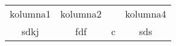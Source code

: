 \documentclass{article}
\begin{document}
\begin{table}[ht]
\centering
\caption{}
\begin{tabular} {cccc}
kolumna1 & kolumna2 &  & kolumna4 \\
sdkj & fdf & c & sds \\
\end{tabular}
\label{tab:tabela1}
\end{table}
\end{document}
